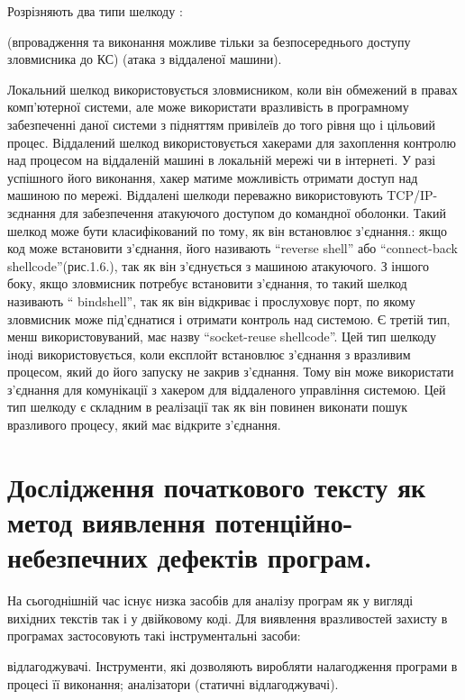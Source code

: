 Розрізняють два типи шелкоду :
\begin{itemize}
 (впровадження та виконання можливе тільки за безпосереднього доступу зловмисника до КС)
 (атака з віддаленої машини). 
\end{itemize}

Локальний шелкод використовується зловмисником, коли він обмежений в правах комп’ютерної системи, але може використати вразливість в програмному забезпеченні даної системи з підняттям привілеїв до того рівня що і цільовий процес.
Віддалений шелкод використовується хакерами для захоплення контролю над процесом на віддаленій машині в локальній мережі чи в інтернеті. У разі успішного його виконання, хакер матиме можливість отримати доступ над машиною по мережі. Віддалені шелкоди переважно використовують  TCP/IP-зєднання для забезпечення атакуючого доступом до командної оболонки. Такий шелкод може бути класифікований по тому, як він встановлює з’єднання.: якщо код може встановити з’єднання, його називають ``reverse shell'' або “connect-back shellcode”(рис.1.6.), так як він з’єднується з машиною атакуючого. З іншого боку, якщо зловмисник потребує встановити з’єднання, то такий шелкод називають “ bindshell”, так як він відкриває і прослуховує порт, по якому зловмисник може під’єднатися і отримати контроль над системою. Є третій тип, менш використовуваний, має назву “socket-reuse shellcode”. Цей тип шелкоду іноді використовується, коли експлойт встановлює з’єднання з вразливим процесом, який до його запуску не закрив з’єднання. Тому він може використати з’єднання для комунікації з хакером для віддаленого управління системою. Цей тип шелкоду є складним в реалізації так як він повинен виконати пошук вразливого процесу, який має відкрите з’єднання.


\section{Дослідження початкового тексту як метод виявлення потенційно-небезпечних дефектів програм.}
\label{1section:id3}
На сьогоднішній час існує низка засобів для аналізу програм як у вигляді вихідних текстів так і у двійковому коді.
Для виявлення вразливостей захисту в програмах застосовують такі інструментальні засоби:
\begin{itemize}
 відлагоджувачі. Інструменти, які дозволяють виробляти налагодження програми в процесі її виконання;
 аналізатори (статичні відлагоджувачі).
\end{itemize}

